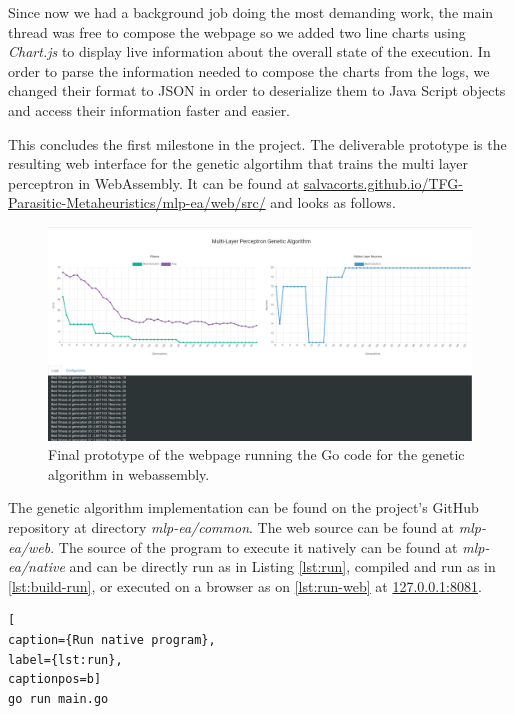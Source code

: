 Since now we had a background job doing the most demanding work, the main thread was free to compose the webpage so we added two line charts using \textit{Chart.js} \cite{chartjs} to display live information about the overall state of the execution. In order to parse the information needed to compose the charts from the logs, we changed their format to JSON in order to deserialize them to Java Script objects and access their information faster and easier.

This concludes the first milestone in the project. The deliverable prototype is the resulting web interface for the genetic algortihm that trains the multi layer perceptron in WebAssembly. It can be found at \href{https://salvacorts.github.io/TFG-Parasitic-Metaheuristics/mlp-ea/web/src/}{salvacorts.github.io/TFG-Parasitic-Metaheuristics/mlp-ea/web/src/} and looks as follows.

\begin{figure}[h!]
		\centering
    	\includegraphics[width=\linewidth]{assets/images/web-milestone1.png}
    	\caption{Final prototype of the webpage running the Go code for the genetic algorithm in webassembly.}
    	\label{image:web-milestone1}
\end{figure}

The genetic algorithm implementation can be found on the project's GitHub repository at directory \textit{mlp-ea/common}. The web source can be found at \textit{mlp-ea/web}. The source of the program to execute it natively can be found at \textit{mlp-ea/native} and can be directly run as in Listing \ref{lst:run}, compiled and run as in \ref{lst:build-run}, or executed on a browser as on \ref{lst:run-web} at \href{127.0.0.1:8081}{127.0.0.1:8081}.

\begin{lstlisting}[
caption={Run native program},
label={lst:run},
captionpos=b]
go run main.go
\end{lstlisting} 

